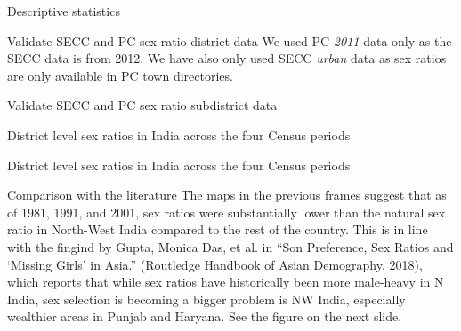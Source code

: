 \documentclass[aspectratio=169]{beamer}
\begin{document}
\begin{section}{Descriptive statistics}
  \begin{frame}{Validate SECC and PC sex ratio district data}
    \small{We used PC \emph{2011} data only as the SECC data is from 2012. We
    have also only used SECC \emph{urban} data as sex ratios are only
    available in PC town directories.}
    \centering
  \end{frame}
  \begin{frame}{Validate SECC and PC sex ratio subdistrict data}
    \centering
  \end{frame}

\begin{frame}{District level sex ratios in India across the four Census periods}
  \centering
  \end{frame}
\begin{frame}{District level sex ratios in India across the four Census periods}
  \centering
\end{frame}

\begin{frame}{Comparison with the literature}
  \centering
  The maps in the previous frames suggest that as of 1981, 1991, and
  2001, sex ratios were substantially lower than the natural sex ratio
  in North-West India compared to the rest of the country. This is in
  line with the fingind by Gupta, Monica Das, et al. in “Son Preference,
  Sex Ratios and ‘Missing Girls’ in Asia.” (Routledge Handbook of Asian
  Demography, 2018), which reports that while sex ratios have
  historically been more male-heavy in N India, sex selection is
  becoming a bigger problem is NW India, especially wealthier areas in
  Punjab and Haryana. See the figure on the next slide.
\end{frame}


\end{section}
\end{document}
